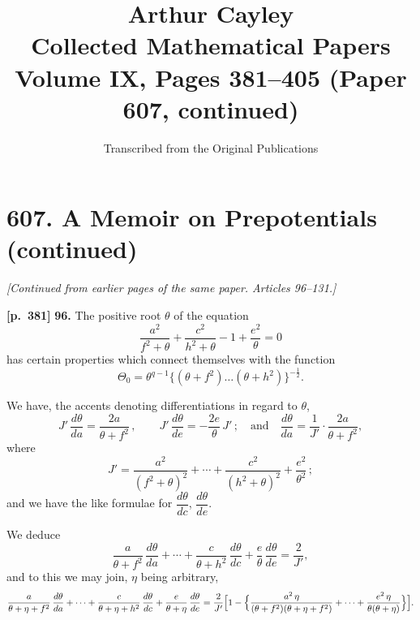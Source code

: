 \documentclass[11pt,a4paper]{article}
\title{\textbf{Arthur Cayley}\\\vspace{0.5em}
\Large Collected Mathematical Papers\\\vspace{0.3em}
\large Volume IX, Pages 381--405 (Paper 607, continued)}
\author{Transcribed from the Original Publications}
\date{}
\begin{document}
\maketitle
\thispagestyle{empty}

\tableofcontents
\newpage

\section*{\textbf{607.} A Memoir on Prepotentials (continued)}

\textit{[Continued from earlier pages of the same paper. Articles 96--131.]}

\bigskip

\noindent\textbf{[p.~381]}\quad
\textbf{96.} The positive root $\theta$ of the equation
\[
\frac{a^{2}}{f^{2}+\theta} + \frac{c^{2}}{h^{2}+\theta} - 1 + \frac{e^{2}}{\theta} = 0
\]
has certain properties which connect themselves with the function
\[
\Theta_{0} = \theta^{q-1}\bigl\{(\theta+f^{2})\ldots(\theta+h^{2})\bigr\}^{-\tfrac{1}{2}}.
\]

We have, the accents denoting differentiations in regard to $\theta$,
\[
J'\,\frac{d\theta}{da} = \frac{2a}{\theta+f^{2}}\,,\qquad J'\,\frac{d\theta}{de} = -\frac{2e}{\theta}\,J'\,;
\quad\text{and}\quad
\frac{d\theta}{da} = \frac{1}{J'}\cdot\frac{2a}{\theta+f^{2}},
\]
where
\[
J' = \frac{a^{2}}{(f^{2}+\theta)^{2}} + \cdots + \frac{c^{2}}{(h^{2}+\theta)^{2}} + \frac{e^{2}}{\theta^{2}}\,;
\]
and we have the like formulae for $\dfrac{d\theta}{dc}$, $\dfrac{d\theta}{de}$.

We deduce
\[
\frac{a}{\theta+f^{2}}\,\frac{d\theta}{da} + \cdots + \frac{c}{\theta+h^{2}}\,\frac{d\theta}{dc} + \frac{e}{\theta}\,\frac{d\theta}{de} = \frac{2}{J'},
\]
and to this we may join, $\eta$ being arbitrary,
\[
\frac{a}{\theta+\eta+f^{2}}\,\frac{d\theta}{da} + \cdots + \frac{c}{\theta+\eta+h^{2}}\,\frac{d\theta}{dc} + \frac{e}{\theta+\eta}\,\frac{d\theta}{de}
= \frac{2}{J'}\Bigl[1 - \Bigl\{ \frac{a^{2}\,\eta}{(\theta+f^{2})(\theta+\eta+f^{2})} + \cdots + \frac{e^{2}\,\eta}{\theta(\theta+\eta)} \Bigr\}\Bigr].
\]
\end{document}
